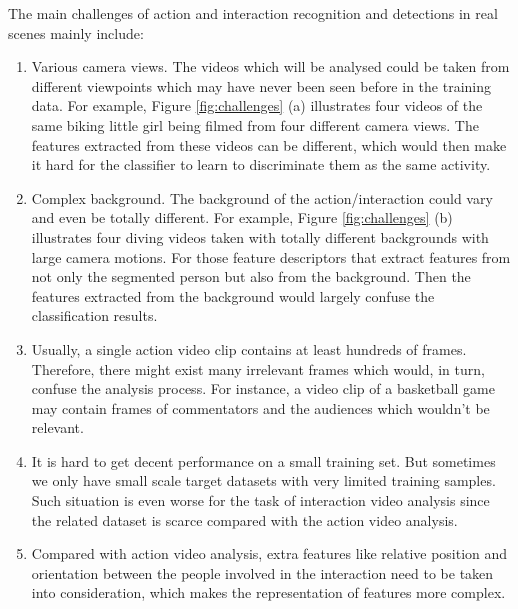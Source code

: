 \par
The main challenges of action and interaction recognition and detections in real scenes mainly include: 
\begin{enumerate}
	\item Various camera views. The videos which will be analysed could be taken from different viewpoints which may have never been seen before in the training data. For example, Figure \ref{fig:challenges} (a) illustrates four videos of the same biking little girl being filmed from four different camera views. The features extracted from these videos can be different, which would then make it hard for the classifier to learn to discriminate them as the same activity. 
	\item Complex background. The background of the action/interaction could vary and even be totally different. For example, Figure \ref{fig:challenges} (b) illustrates four diving videos taken with totally different backgrounds with large camera motions. For those feature descriptors that extract features from not only the segmented person but also from the background. Then the features extracted from the background would largely confuse the classification results.  
	\item Usually, a single action video clip contains at least hundreds of frames. Therefore, there might exist many irrelevant frames which would, in turn, confuse the analysis process. For instance, a video clip of a basketball game may contain frames of commentators and the audiences which wouldn't be relevant. 
	\item It is hard to get decent performance on a small training set. But sometimes we only have small scale target datasets with very limited training samples. Such situation is even worse for the task of interaction video analysis since the related dataset is scarce compared with the action video analysis.
	\item Compared with action video analysis, extra features like relative position and orientation between the people involved in the interaction need to be taken into consideration, which makes the representation of features more complex. 
\end{enumerate}

